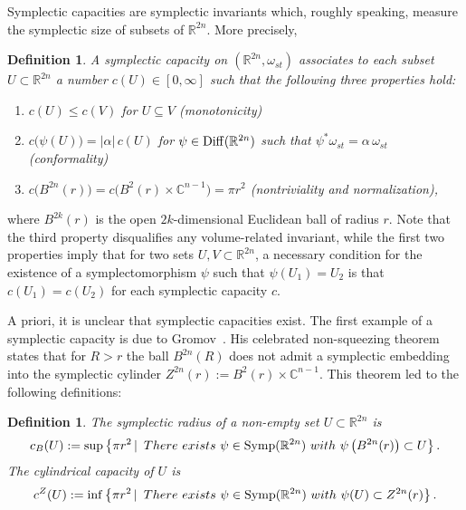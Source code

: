 \documentclass[12pt]{article}
\newtheorem{definition}[lemma]{Definition}
\begin{document}
Symplectic capacities are symplectic invariants which, roughly
speaking, measure the symplectic size of subsets of ${\mathbb
R}^{2n}$. More precisely,

\begin{definition} \label{Def-sym-cap}
A symplectic capacity on $({\mathbb R}^{2n},\omega_{st})$ associates
to each  subset $U \subset {\mathbb R}^{2n}$ a number $c(U) \in
[0,\infty]$ such that the following three properties hold:
\begin{enumerate}
\item[(P1)] $c(U) \leq c(V)$ for $U \subseteq V$ (monotonicity)
\item[(P2)] $c \big (\psi(U) \big )= |\alpha| \, c(U)$ for  $\psi
\in {\rm Diff} ( {\mathbb R}^{2n} )$ such that $\psi^*\omega_{st} =
\alpha \, \omega_{st}$ (conformality) \item[(P3)] $c \big (B^{2n}(r)
\big ) = c \big (B^2(r) \times {\mathbb C}^{n-1} \big ) = \pi r^2$
(nontriviality and normalization),
\end{enumerate}
\end{definition}

\noindent where $B^{2k}(r)$ is the open $2k$-dimensional Euclidean
ball of radius $r$. Note that the third property disqualifies any
volume-related invariant, while the first two properties imply that
for two sets $U,V \subset {\mathbb R}^{2n}$, a necessary condition
for the existence of a symplectomorphism $\psi$ such that $\psi
(U_1) = U_2$ is that $c(U_1) = c(U_2)$ for each symplectic capacity
$c$.


A priori, it is unclear that symplectic capacities exist. The
first example of a symplectic capacity is due to Gromov~\cite{G}.
His celebrated non-squeezing theorem states that for $R
> r$ the ball $B^{2n}(R)$ does not admit a symplectic embedding
into the symplectic cylinder $Z^{2n}(r):= B^2(r) \times {\mathbb
C}^{n-1}$. This theorem led to the following definitions:

\begin{definition} The symplectic radius of a non-empty set
$U \subset {\mathbb R}^{2n}$ is
$$ c_B(U) := \sup \left \{\pi r^2 \, | \,
\ There \ exists \  \psi \in {\rm Symp}({\mathbb R}^{2n}) \ with \
\psi \left (B^{2n}(r) \right ) \subset U \right  \}.$$ The
cylindrical capacity of $U$ is
$$ {c}^Z(U) := \inf \left \{\pi r^2 \, | \,
\ There \ exists \  \psi \in {\rm Symp}({\mathbb R}^{2n}) \ with \
\psi (U) \subset Z^{2n}(r)  \right  \}.$$
\end{definition}
\end{document}
